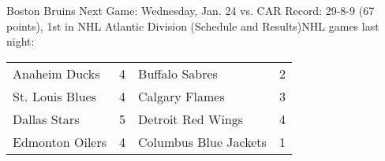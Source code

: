 Boston Bruins
Next Game: Wednesday, Jan. 24 vs. CAR
Record: 29-8-9 (67 points), 1st in NHL Atlantic Division (Schedule and Results)NHL games last night:
\begin{tabular}{llll}
\toprule
  Anaheim Ducks & 4 &        Buffalo Sabres & 2 \\
St. Louis Blues & 4 &        Calgary Flames & 3 \\
   Dallas Stars & 5 &     Detroit Red Wings & 4 \\
Edmonton Oilers & 4 & Columbus Blue Jackets & 1 \\
\bottomrule
\end{tabular}
